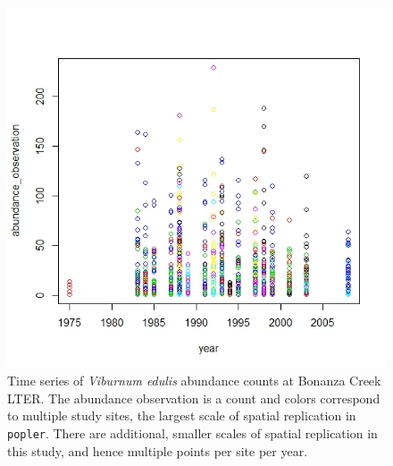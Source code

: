 \documentclass{article}\usepackage[]{graphicx}\usepackage[]{color}
\begin{document}
\newpage
\begin{figure}[h!]
  \begin{center}
    \includegraphics[scale=0.8]{BNZ_plot}
    \caption{Time series of \textit{Viburnum edulis} abundance counts at Bonanza Creek LTER. The abundance observation is a count and colors correspond to multiple study sites, the largest scale of spatial replication in \texttt{popler}. There are additional, smaller scales of spatial replication in this study, and hence multiple points per site per year.}
    \label{Fig:BNZ_plot}
  \end{center}
\end{figure}
\end{document}
